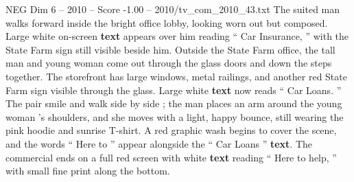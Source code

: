 \begin{textsample}{NEG Dim 6 – 2010 – Score -1.00 – 2010/tv\_com\_2010\_43.txt}
The suited man walks forward inside the bright office lobby, looking worn out but composed.
Large white on-screen \textbf{text} appears over him reading “ Car Insurance, ” with the State Farm sign still visible beside him.
Outside the State Farm office, the tall man and young woman come out through the glass doors and down the steps together.
The storefront has large windows, metal railings, and another red State Farm sign visible through the glass.
Large white \textbf{text} now reads “ Car Loans. ” The pair smile and walk side by side ; the man places an arm around the young woman ’s shoulders, and she moves with a light, happy bounce, still wearing the pink hoodie and sunrise T-shirt.
A red graphic wash begins to cover the scene, and the words “ Here to ” appear alongside the “ Car Loans ” \textbf{text}.
The commercial ends on a full red screen with white \textbf{text} reading “ Here to help, ” with small fine print along the bottom.

\end{textsample}
